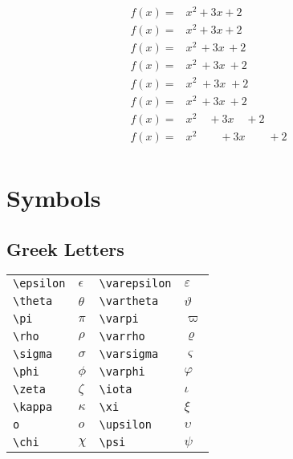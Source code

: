 \begin{equation*}
    \begin{aligned}
	f(x) =& x^2\! + 3x\! + 2 \\
	f(x) =& x^2 + 3x + 2 \\
	f(x) =& x^2\, + 3x\, + 2 \\
	f(x) =& x^2\: + 3x\: + 2 \\
	f(x) =& x^2\; + 3x\; + 2 \\
	f(x) =& x^2\ + 3x\ + 2 \\
	f(x) =& x^2\quad + 3x\quad + 2 \\
	f(x) =& x^2\qquad + 3x\qquad + 2 \\
    \end{aligned}
\end{equation*}

\section{Symbols}

\subsection{Greek Letters}
\begin{table}[!htbp]
    \centering
    \begin{tabular}{lp{2cm}lp{2cm}}
	\verb|\epsilon|	& $\epsilon$	& \verb|\varepsilon|	& $\varepsilon$    \\
	\verb|\theta|	& $\theta$	& \verb|\vartheta|	& $\vartheta$   \\
	\verb|\pi|	& $\pi$		& \verb|\varpi|		& $\varpi$    \\
	\verb|\rho|	& $\rho$	& \verb|\varrho|	& $\varrho$    \\
	\verb|\sigma|	& $\sigma$	& \verb|\varsigma|	& $\varsigma$    \\
	\verb|\phi|	& $\phi$	& \verb|\varphi|	& $\varphi$    \\
	\hline
	\verb|\zeta|	& $\zeta$	& \verb|\iota|		& $\iota$    \\
	\verb|\kappa|	& $\kappa$	& \verb|\xi|		& $\xi$    \\
	\verb|o|	& $o$		& \verb|\upsilon|	& $\upsilon$    \\
	\verb|\chi|	& $\chi$	& \verb|\psi|		& $\psi$    \\
    \end{tabular}
\end{table}

